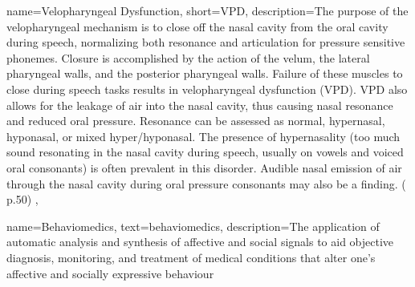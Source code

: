 
 {
	name={Velopharyngeal Dysfunction}, 
	short={VPD},
	description={The purpose of the velopharyngeal mechanism is to close off the nasal cavity from the oral cavity during speech, normalizing both resonance and articulation for pressure sensitive phonemes. Closure is accomplished by the action of the velum, the lateral pharyngeal walls, and the posterior pharyngeal walls. Failure of these muscles to close during speech tasks results in velopharyngeal dysfunction (VPD). VPD also allows for the leakage of air into the nasal cavity, thus causing nasal resonance and reduced oral pressure. Resonance can be assessed as normal, hypernasal, hyponasal, or mixed hyper/hyponasal. The presence of hypernasality (too much sound resonating in the nasal cavity during speech, usually on vowels and voiced oral consonants) is often prevalent in this disorder. Audible nasal emission of air through the nasal cavity during oral pressure consonants may also be a finding. (\cite{SLPathologies} p.50)
},
}

 {
	name={Behaviomedics}, 
	text={behaviomedics},
	description={The application of automatic analysis and synthesis of affective and social
signals to aid objective diagnosis, monitoring, and treatment of medical conditions that alter
one's affective and socially expressive behaviour \cite{Martinez2016}
}
}









